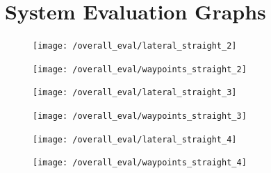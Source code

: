\documentclass[titlepage,draft]{article}
\begin{document}
{\section{System Evaluation Graphs}
\label{SecondAppendix}

\begin{figure}[H]
	\centering
	\begin{minipage}{.45\textwidth}
		\centering
		\texttt{[image: /overall\_eval/lateral\_straight\_2]}
		\label{fig:straight_lat_2}
	\end{minipage}%
	\hspace{0.1\textwidth}%
	\begin{minipage}{.45\textwidth}
		\centering
		\texttt{[image: /overall\_eval/waypoints\_straight\_2]}
		\label{fig:straight_way_2}
	\end{minipage}
\end{figure}

\begin{figure}[H]
	\centering
	\begin{minipage}{.45\textwidth}
		\centering
		\texttt{[image: /overall\_eval/lateral\_straight\_3]}
		\label{fig:straight_lat_3}
	\end{minipage}%
	\hspace{0.1\textwidth}%
	\begin{minipage}{.45\textwidth}
		\centering
		\texttt{[image: /overall\_eval/waypoints\_straight\_3]}
		\label{fig:straight_way_3}
	\end{minipage}
\end{figure}

\begin{figure}[H]
	\centering
	\begin{minipage}{.45\textwidth}
		\centering
		\texttt{[image: /overall\_eval/lateral\_straight\_4]}
		\label{fig:straight_lat_4}
	\end{minipage}%
	\hspace{0.1\textwidth}%
	\begin{minipage}{.45\textwidth}
		\centering
		\texttt{[image: /overall\_eval/waypoints\_straight\_4]}
		\label{fig:straight_way_4}
	\end{minipage}
\end{figure}

}
\end{document}
